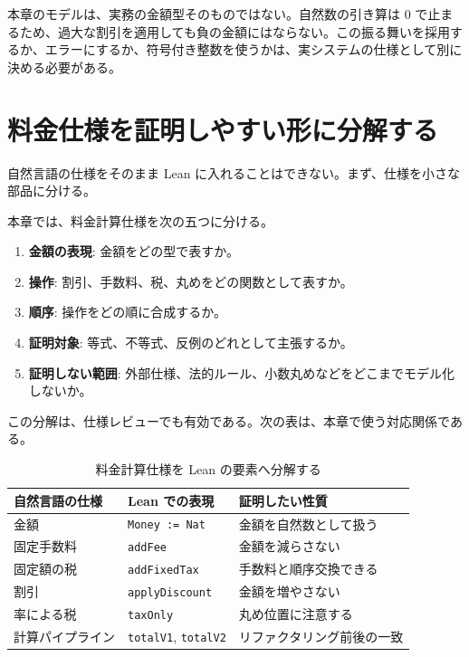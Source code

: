 \begin{warningbox}
本章のモデルは、実務の金額型そのものではない。自然数の引き算は 0 で止まるため、過大な割引を適用しても負の金額にはならない。この振る舞いを採用するか、エラーにするか、符号付き整数を使うかは、実システムの仕様として別に決める必要がある。
\end{warningbox}

\section{料金仕様を証明しやすい形に分解する}

自然言語の仕様をそのまま Lean に入れることはできない。まず、仕様を小さな部品に分ける。

\begin{definitionbox}
本章では、料金計算仕様を次の五つに分ける。
\begin{enumerate}
\item \textbf{金額の表現}: 金額をどの型で表すか。
\item \textbf{操作}: 割引、手数料、税、丸めをどの関数として表すか。
\item \textbf{順序}: 操作をどの順に合成するか。
\item \textbf{証明対象}: 等式、不等式、反例のどれとして主張するか。
\item \textbf{証明しない範囲}: 外部仕様、法的ルール、小数丸めなどをどこまでモデル化しないか。
\end{enumerate}
\end{definitionbox}

この分解は、仕様レビューでも有効である。次の表は、本章で使う対応関係である。

\begin{table}[htbp]
\centering
\caption{料金計算仕様を Lean の要素へ分解する}
\label{tab:ch20-spec-decomposition}
\begin{tabular}{lll}
\toprule
自然言語の仕様 & Lean での表現 & 証明したい性質 \\
\midrule
金額 & \texttt{Money := Nat} & 金額を自然数として扱う \\
固定手数料 & \texttt{addFee} & 金額を減らさない \\
固定額の税 & \texttt{addFixedTax} & 手数料と順序交換できる \\
割引 & \texttt{applyDiscount} & 金額を増やさない \\
率による税 & \texttt{taxOnly} & 丸め位置に注意する \\
計算パイプライン & \texttt{totalV1}, \texttt{totalV2} & リファクタリング前後の一致 \\
\bottomrule
\end{tabular}
\end{table}

